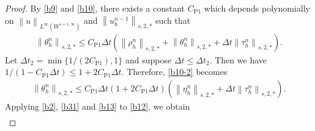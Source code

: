 \documentclass[10pt,a4paper,tbtags,leqno]{amsart}
\theoremstyle{definition}
\numberwithin{equation}{section}
\def\norm#1#2{\left\|#2\right\|_{#1}}
\begin{document}
\begin{proof}
  By \eqref{b9} and \eqref{b10}, there exists a constant $ C_{\mathrm{P}1} $ which depends polynomially on $ \norm{L^\infty (W^{s + 1, \infty})}{u} $ and $ \norm{s, 2, \ast}{u_h^{n-1}} $ such that 
  \begin{align}
    \norm{s, 2, \ast}{\theta_h^n} \leq C_{\mathrm{P}1} \Delta t \left(\norm{s, 2, \ast}{\rho_h^n} + \norm{s, 2, \ast}{\theta_h^n} + \Delta t \norm{s, 2, \ast}{\tau_h^n}\right). 
    \label{b10-2}
  \end{align}
  Let $ \Delta t_2 = \min \{1/(2 C_{\mathrm{P}1}), 1\} $ and suppose $ \Delta t \leq \Delta t_2 $. 
  Then we have $ 1 / (1 - C_{\mathrm{P}1} \Delta t) \leq 1 + 2 C_{\mathrm{P}1} \Delta t $. 
  Therefore, \eqref{b10-2} becomes 
  \begin{align}
    \norm{s, 2, \ast}{\theta_h^n} \leq C_{\mathrm{P}1} \Delta t (1 + 2 C_{\mathrm{P}1} \Delta t) \left(\norm{s, 2, \ast}{\eta_h^n} + \Delta t \norm{s, 2, \ast}{\tau_h^n}\right). 
    \label{b13}
  \end{align}
  Applying \eqref{b2}, \eqref{b31} and \eqref{b13} to \eqref{b12}, we obtain 
  \begin{align} 

\end{align}
\end{proof}
\end{document}
